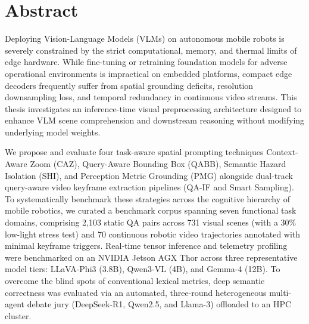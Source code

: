 \section*{Abstract}

Deploying Vision-Language Models (VLMs) on autonomous mobile robots is severely constrained by the strict computational, memory, and thermal limits of edge hardware. While fine-tuning or retraining foundation models for adverse operational environments is impractical on embedded platforms, compact edge decoders frequently suffer from spatial grounding deficits, resolution downsampling loss, and temporal redundancy in continuous video streams. This thesis investigates an inference-time visual preprocessing architecture designed to enhance VLM scene comprehension and downstream reasoning without modifying underlying model weights.

We propose and evaluate four task-aware spatial prompting techniques Context-Aware Zoom (CAZ), Query-Aware Bounding Box (QABB), Semantic Hazard Isolation (SHI), and Perception Metric Grounding (PMG) alongside dual-track query-aware video keyframe extraction pipelines (QA-IF and Smart Sampling). To systematically benchmark these strategies across the cognitive hierarchy of mobile robotics, we curated a benchmark corpus spanning seven functional task domains, comprising 2,103 static QA pairs across 731 visual scenes (with a 30\% low-light stress test) and 70 continuous robotic video trajectories annotated with minimal keyframe triggers. Real-time tensor inference and telemetry profiling were benchmarked on an NVIDIA Jetson AGX Thor across three representative model tiers: LLaVA-Phi3 (3.8B), Qwen3-VL (4B), and Gemma-4 (12B). To overcome the blind spots of conventional lexical metrics, deep semantic correctness was evaluated via an automated, three-round heterogeneous multi-agent debate jury (DeepSeek-R1, Qwen2.5, and Llama-3) offloaded to an HPC cluster.


